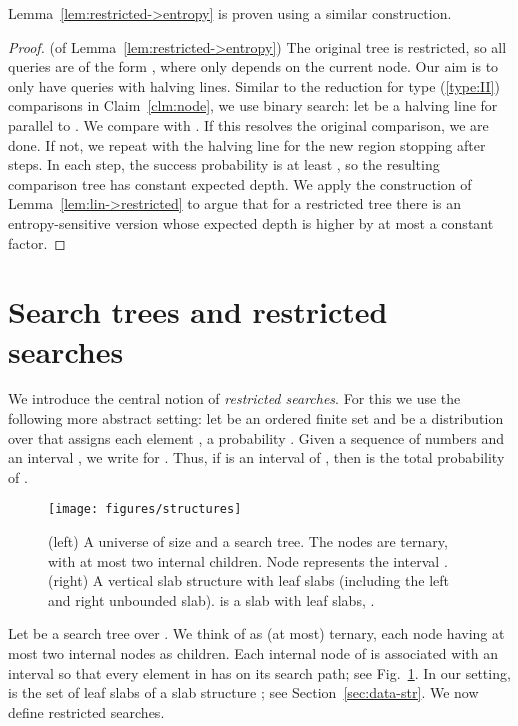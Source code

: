 \documentclass[letterpaper,11pt]{article}
\begin{document}
Lemma~\ref{lem:restricted->entropy} is proven using a similar construction.

\begin{proof} (of Lemma~\ref{lem:restricted->entropy}) The original tree is
restricted, so all queries are of the form , where 
only depends on the current node. Our aim is to only have queries with halving lines.
Similar to the 
reduction for type (\ref{type:II}) 
comparisons in Claim~\ref{clm:node}, 
we use binary search: 
let  be a halving line
for  parallel to . We 
compare  with . If 
this resolves the original comparison, 	
we are done. If not, we 
repeat with the halving 
line for the new region 
stopping after  steps. 
In each step, the success probability
is at least , so the resulting 
comparison tree has constant expected 
depth. We apply the construction
of Lemma~\ref{lem:lin->restricted} 
to argue that for a restricted 
tree  there is an entropy-sensitive 
version  whose
expected depth is higher by at 
most a constant factor.
\end{proof}


\section{Search trees and restricted searches} \label{sec:rest}

We introduce the central notion of 
\emph{restricted searches}. For this
we use the following more abstract setting:
let  be an ordered finite set 
and  be a distribution over  
that assigns each element , 
a probability .
Given a sequence  of numbers 
and an interval , we write  
for .
Thus, if  is an interval of , 
then  is the total probability of .

\begin{figure}
  \centering
  \texttt{[image: figures/structures]}
  \caption{(left) A universe of size  and a 
  search tree. The nodes are ternary, 
  with at most two internal children.
  Node  represents the interval 
  .
  (right) A vertical slab structure with 
   leaf slabs (including the left and
  right unbounded slab). 
   is a  slab with
   leaf slabs, .  }
 \label{fig:structures}
\end{figure}

Let  be a search tree over . We think 
of  as (at most) ternary, each node having at 
most two internal nodes as children.
Each internal node  of  is associated
with an interval  so that
every element in  has  on its 
search path; see Fig.~\ref{fig:structures}. 
In our setting,  is 
the set of leaf slabs of a slab structure 
; see Section~\ref{sec:data-str}.
We now define restricted searches.
\end{document}
